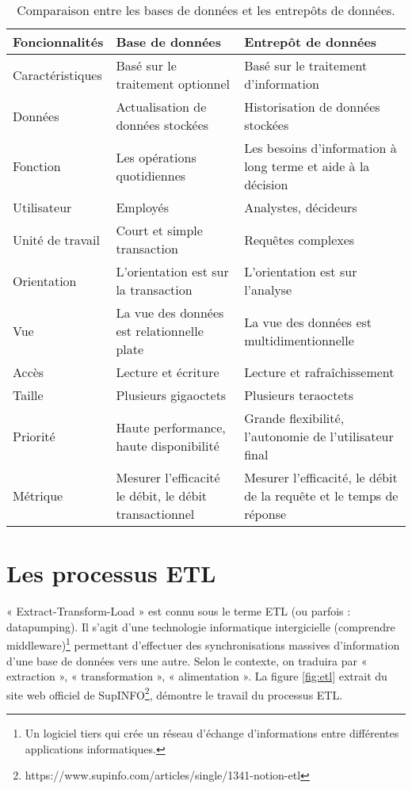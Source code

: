 \begin{table}[H]
    \centering
    \caption{Comparaison entre les bases de données et les entrepôts de données.}
    \begin{tabular}[t]{|p{3cm}|p{6cm}|p{6cm}|} 
        \hline
        \textbf{Foncionnalités} & \textbf{Base de données} & \textbf{Entrepôt de données} \\
        \hline\hline
        Caractéristiques & Basé sur le traitement optionnel & Basé sur le traitement
        d’information \\
        \hline
        Données & Actualisation de données stockées & Historisation de données stockées \\ 
        \hline
        Fonction & Les opérations quotidiennes & Les besoins d’information à long terme et aide à la décision \\ 
        \hline
        Utilisateur & Employés & Analystes, décideurs \\ 
        \hline
        Unité de travail & Court et simple transaction & Requêtes complexes \\ 
        \hline
        Orientation & L’orientation est sur la transaction & L’orientation est sur l’analyse \\ 
        \hline
        Vue & La vue des données est relationnelle plate & La vue des données est multidimentionnelle \\ 
        \hline
        Accès & Lecture et écriture & Lecture et rafraîchissement \\
        \hline
        Taille & Plusieurs gigaoctets & Plusieurs teraoctets \\
        \hline
        Priorité & Haute performance, haute disponibilité & Grande flexibilité, l’autonomie de l’utilisateur final \\
        \hline
        Métrique & Mesurer l’efficacité le débit, le débit transactionnel & Mesurer l’efficacité, le débit de la requête et le temps de réponse \\ 
        \hline\hline
    \end{tabular}
    \label{tab:comparaisonbdded}
\end{table}%



\section{Les processus ETL}
« Extract-Transform-Load » est connu sous le terme ETL (ou parfois : datapumping). Il s'agit d'une technologie informatique intergicielle (comprendre middleware)\footnote{Un logiciel tiers qui crée un réseau d'échange d'informations entre différentes applications informatiques.} permettant d'effectuer des synchronisations massives d'information d'une base de données vers une autre. Selon le contexte, on traduira par « extraction », « transformation », « alimentation ». La figure \ref{fig:etl} extrait du site web officiel de SupINFO\footnote{https://www.supinfo.com/articles/single/1341-notion-etl}, démontre le travail du processus ETL. 

